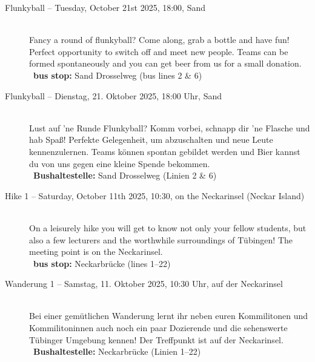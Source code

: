 \begin{description}
\ifml
    \item[Flunkyball -- Tuesday, October 21st 2025, 18:00, Sand]~\\
    Fancy a round of flunkyball? Come along, grab a bottle and have fun!
    Perfect opportunity to switch off and meet new people.
    Teams can be formed spontaneously and you can get beer from us for a small donation.\\
    ~\textbf{bus stop:} Sand Drosselweg (bus lines 2 \& 6)
\else
    \item[Flunkyball -- Dienstag, 21. Oktober 2025, 18:00 Uhr, Sand]~\\
    Lust auf 'ne Runde Flunkyball? Komm vorbei, schnapp dir 'ne Flasche und hab Spaß!
    Perfekte Gelegenheit, um abzuschalten und neue Leute kennenzulernen.
    Teams können spontan gebildet werden und Bier kannst du von uns gegen eine kleine Spende bekommen.\\
    ~\textbf{Bushaltestelle:} Sand Drosselweg (Linien 2 \& 6)
\fi


\ifml
\item[Hike 1 -- Saturday, October 11th 2025, 10:30, on the Neckarinsel (Neckar Island)]~\\
On a leisurely hike you will get to know not only your fellow students,
but also a few lecturers and the worthwhile surroundings of Tübingen!
The meeting point is on the Neckarinsel.\\
~\textbf{bus stop:} Neckarbrücke (lines 1--22)
\else
\item[Wanderung 1 -- Samstag, 11. Oktober 2025, 10:30 Uhr, auf der Neckarinsel]~\\
Bei einer gemütlichen Wanderung lernt ihr neben euren Kommilitonen und Kommilitoninnen auch
noch ein paar Dozierende und die sehenswerte Tübinger Umgebung kennen!
Der Treffpunkt ist auf der Neckarinsel.\\
~\textbf{Bushaltestelle:} Neckarbrücke (Linien 1--22)
\fi

\ifmaster \ifinfo \iflehramt \else \pagebreak \fi \fi \fi
\ifmaster \ifmedien \pagebreak \fi \fi
\ifmaster \ifmedinfo \pagebreak \fi \fi
\ifmaster \ifkogwiss \pagebreak \fi \fi


\end{description}
